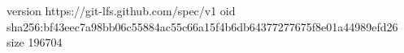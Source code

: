 version https://git-lfs.github.com/spec/v1
oid sha256:bf43eec7a98bb06c55884ac55c66a15f4b6db64377277675f8e01a44989efd26
size 196704
